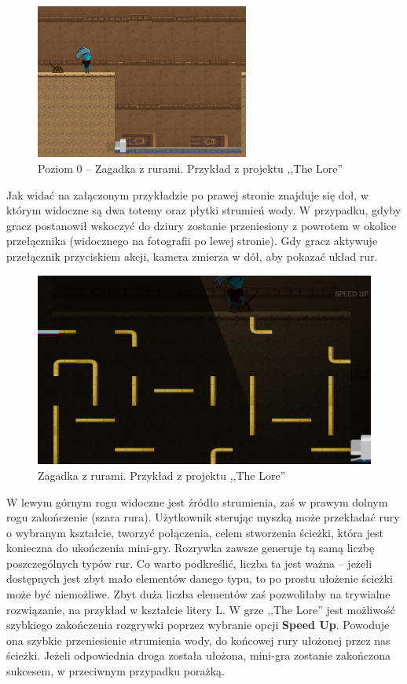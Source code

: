 \documentclass[oneside,polski,logo]{amuthesis}
\begin{document}
\begin{figure}[h]
	\centering
	\includegraphics[width=7cm]{images/tyrek/ruryLvl0.png}
	\caption{Poziom 0 – Zagadka z rurami. Przykład z projektu ,,The Lore''}
\end{figure}

Jak widać na załączonym przykładzie po prawej stronie znajduje się doł, w którym widoczne są dwa totemy oraz płytki strumień wody. W przypadku, gdyby gracz postanowił wskoczyć do dziury zostanie przeniesiony z powrotem w okolice przełącznika (widocznego na fotografii po lewej stronie). Gdy gracz aktywuje przełącznik przyciskiem akcji, kamera zmierza w dół, aby pokazać układ rur.

\begin{figure}[h]
	\centering
	\includegraphics[width=12cm]{images/tyrek/pipes.png}
	\caption{Zagadka z rurami. Przykład z projektu ,,The Lore''}
\end{figure}

W lewym górnym rogu widoczne jest źródło strumienia, zaś w prawym dolnym rogu zakończenie (szara rura). Użytkownik sterując myszką może przekładać rury o wybranym kształcie, tworzyć połączenia, celem stworzenia ścieżki, która jest konieczna do ukończenia mini-gry. Rozrywka zawsze generuje tą samą liczbę poszczególnych typów rur. Co warto podkreślić, liczba ta jest ważna – jeżeli dostępnych jest zbyt mało elementów danego typu, to po prostu ułożenie ścieżki może być niemożliwe. Zbyt duża liczba elementów zaś pozwoliłaby na trywialne rozwiązanie, na przykład w kształcie litery L. W grze ,,The Lore'' jest możliwość szybkiego zakończenia rozgrywki poprzez wybranie opcji \textbf{Speed Up}. Powoduje ona szybkie przeniesienie strumienia wody, do końcowej rury ułożonej przez nas ścieżki. Jeżeli odpowiednia droga została ułożona, mini-gra zostanie zakończona sukcesem, w przeciwnym przypadku porażką.
\end{document}
